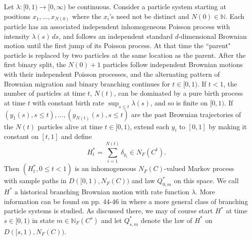 \documentclass[12pt]{article}
\numberwithin{theorem}{section}
\theoremstyle{def}
\numberwithin{equation}{section}
\newcommand{\N}{\mathbb{N}}
\begin{document}
Let $\lambda:[0,1)\to [0,\infty)$ be continuous.  Consider a particle system starting at positions $x_1,\dots, x_{N(0)}$ where the $x_i$'s need not be distinct and $N(0)\in \N$. Each particle has an associated independent   inhomogeneous Poisson process with intensity $\lambda(s)\,ds$, and follows an independent standard $d$-dimensional Brownian motion until the first jump of its Poisson process.    At that time the ``parent" particle is replaced by two particles at the same location as the parent. After the first binary split, the $N(0)+1$ particles follow independent Brownian motions with their independent Poisson processes, and the alternating pattern of Brownian migration and binary branching continues for $t\in[0,1)$.  If $t<1$, the number of particles at time $t$, $N(t)$, can be dominated by a pure birth process at time $t$ with constant birth rate $\sup_{s\le t}\lambda(s)$, and so is finite on $[0,1)$. If $(y_1(s), s\le t),\dots,(y_{N(t)}(s), s\le t)$ are the past Brownian trajectories of the $N(t)$ particles alive at time $t\in[0,1)$, extend each $y_i$ to $[0,1]$ by making it constant on $[t,1]$ and define
\begin{equation}\label{Hrep1}H^*_t=\sum_{i=1}^{N(t)}\delta_{y_i}\in N_F(C^t).
\end{equation}
Then $(H^*_t,0\le t<1)$ is an inhomogeneous $N_F(C)$-valued Markov process with sample paths in $D([0,1),N_F(C))$ and law $Q^*_{0,m}$ on this space. We call $H^*$ a historical branching Brownian motion with rate function $\lambda$. More information can be found on pp. 44-46 in \cite{DP91} where a more general class of branching particle systems is studied.   As discussed there, we may of course start $H^*$ at time $s\in[0,1)$ in state $m\in\N_F(C^s)$ and let $Q^*_{s,m}$ denote the law of $H^*$ on $D([s,1),N_F(C))$.  
\end{document}
